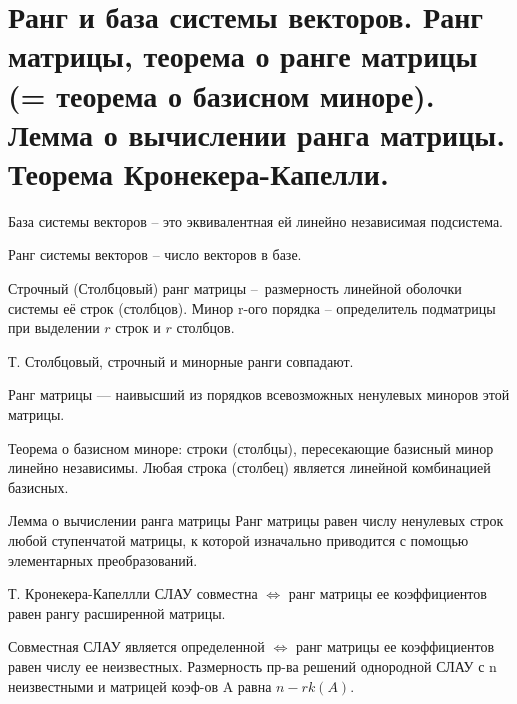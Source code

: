 \documentclass{article}
\begin{document}
\section{Ранг и база системы векторов. Ранг матрицы, теорема о ранге матрицы (= теорема о базисном миноре). Лемма о вычислении ранга матрицы. Теорема Кронекера-Капелли.}
\textsf{База} системы векторов – это эквивалентная ей линейно независимая подсистема.

\textsf{Ранг} системы векторов – число векторов в базе.

Строчный (Столбцовый) ранг матрицы – размерность линейной оболочки системы её строк (столбцов). Минор r-ого порядка – определитель подматрицы при выделении $r$ строк и $r$ столбцов.

Т. Столбцовый, строчный и минорные ранги совпадают.

\textsf{Ранг матрицы} — наивысший из порядков всевозможных ненулевых миноров этой матрицы.

\textsf{Теорема о базисном миноре:} строки (столбцы), пересекающие базисный минор линейно независимы. Любая строка (столбец) является линейной комбинацией базисных.

\textsf{Лемма о вычислении ранга матрицы}
Ранг матрицы равен числу ненулевых строк любой ступенчатой матрицы, к которой изначально приводится с помощью элементарных преобразований.

\textsf{Т. Кронекера-Капеллли} СЛАУ совместна $\Leftrightarrow$ ранг матрицы ее коэффициентов равен рангу расширенной матрицы.

Совместная СЛАУ является определенной $\Leftrightarrow$ ранг матрицы ее коэффициентов равен числу ее неизвестных. Размерность пр-ва решений однородной СЛАУ с n неизвестными и матрицей коэф-ов A равна $n-rk(A)$.
\end{document}
